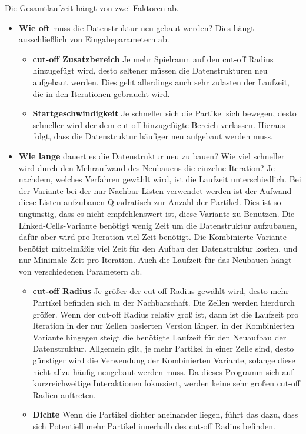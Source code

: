 \documentclass[
	12pt,
	a4paper,
	BCOR10mm,
	DIV14,
	headsepline,
]{scrreprt}
\begin{document}
Die Gesamtlaufzeit hängt von zwei Faktoren ab. 
\begin{itemize}
	\item\textbf{Wie oft} muss die Datenstruktur neu gebaut werden? Dies hängt ausschließlich von Eingabeparametern ab.
		\begin{itemize}
			\item \textbf{cut-off Zusatzbereich} Je mehr Spielraum auf den cut-off Radius hinzugefügt wird, desto seltener müssen die Datenstrukturen neu aufgebaut werden. Dies geht allerdings auch sehr zulasten der Laufzeit, die in den Iterationen gebraucht wird.
			\item \textbf{Startgeschwindigkeit} Je schneller sich die Partikel sich bewegen, desto schneller wird der dem cut-off hinzugefügte Bereich verlassen. Hieraus folgt, dass die Datenstruktur häufiger neu aufgebaut werden muss.
		\end{itemize}
	\item\textbf{Wie lange} dauert es die Datenstruktur neu zu bauen? Wie viel schneller wird durch den Mehraufwand des Neubauens die einzelne Iteration? Je nachdem, welches Verfahren gewählt wird, ist die Laufzeit unterschiedlich. Bei der Variante bei der nur Nachbar-Listen verwendet werden ist der Aufwand diese Listen aufzubauen Quadratisch zur Anzahl der Partikel. Dies ist so ungünstig, dass es nicht empfehlenswert ist, diese Variante zu Benutzen. Die Linked-Cells-Variante benötigt wenig Zeit um die Datenstruktur aufzubauen, dafür aber wird pro Iteration viel Zeit benötigt. Die Kombinierte Variante benötigt mittelmäßig viel Zeit für den Aufbau der Datenstruktur kosten, und nur Minimale Zeit pro Iteration. Auch die Laufzeit für das Neubauen hängt von verschiedenen Parametern ab.
	\begin{itemize}
		\item \textbf{cut-off Radius} Je größer der cut-off Radius gewählt wird, desto mehr Partikel befinden sich in der Nachbarschaft. Die Zellen werden hierdurch größer. Wenn der cut-off Radius relativ groß ist, dann ist die Laufzeit pro Iteration in der nur Zellen basierten Version länger, in der Kombinierten Variante hingegen steigt die benötigte Laufzeit für den Neuaufbau der Datenstruktur. Allgemein gilt, je mehr Partikel in einer Zelle sind, desto günstiger wird die Verwendung der Kombinierten Variante, solange diese nicht allzu häufig neugebaut werden muss. Da dieses Programm sich auf kurzreichweitige Interaktionen fokussiert, werden keine sehr großen cut-off Radien auftreten.
		\item \textbf{Dichte} Wenn die Partikel dichter aneinander liegen, führt das dazu, dass sich Potentiell mehr Partikel innerhalb des cut-off Radius befinden.

\end{itemize}
\end{itemize}
\end{document}
